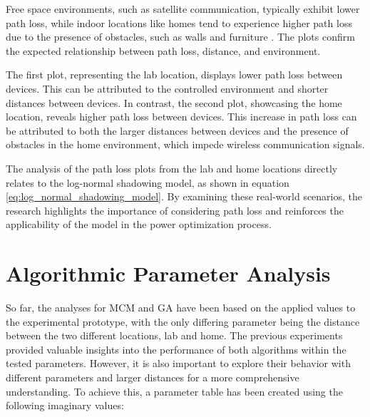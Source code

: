 Free space environments, such as satellite communication, typically exhibit lower path loss, while indoor locations like homes tend to experience higher path loss due to the presence of obstacles, such as walls and furniture \cite{cho2010mimo}. The plots confirm the expected relationship between path loss, distance, and environment.

The first plot, representing the lab location, displays lower path loss between devices. This can be attributed to the controlled environment and shorter distances between devices. In contrast, the second plot, showcasing the home location, reveals higher path loss between devices. This increase in path loss can be attributed to both the larger distances between devices and the presence of obstacles in the home environment, which impede wireless communication signals.

The analysis of the path loss plots from the lab and home locations directly relates to the log-normal shadowing model, as shown in equation \ref{eq:log_normal_shadowing_model}. By examining these real-world scenarios, the research highlights the importance of considering path loss and reinforces the applicability of the model in the power optimization process.


\section{Algorithmic Parameter Analysis}

So far, the analyses for \gls{MCM} and \gls{GA} have been based on the applied values to the experimental prototype, with the only differing parameter being the distance between the two different locations, lab and home. The previous experiments provided valuable insights into the performance of both algorithms within the tested parameters. However, it is also important to explore their behavior with different parameters and larger distances for a more comprehensive understanding. To achieve this, a parameter table has been created using the following imaginary values:

